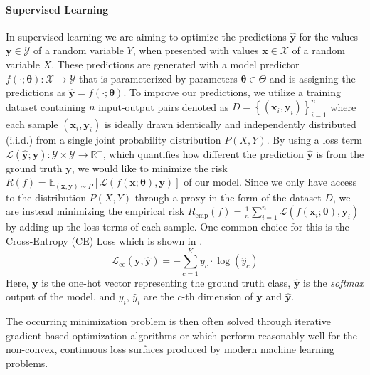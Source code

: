 \paragraph{Supervised Learning}
In supervised learning we are aiming to optimize the predictions $\mathbf{\hat{y}}$ for the values $\mathbf{y} \in \mathcal{Y}$ of a random variable $Y$, when presented with values $\mathbf{x} \in \mathcal{X}$ of a random variable $X$. These predictions are generated with a model predictor $f(\cdot;\boldsymbol{\theta}): \mathcal{X} \rightarrow \mathcal{Y}$ that is parameterized by parameters $\boldsymbol{\theta} \in \Theta$  and is assigning the predictions as $\mathbf{\hat{y}}=f(\cdot;\boldsymbol{\theta})$. To improve our predictions, we utilize a training dataset containing $n$ input-output pairs denoted as $D=\left\{\left(\mathbf{x}_{i}, \mathbf{y}_{i}\right)\right\}_{i=1}^{n}$ where each sample $(\mathbf{x}_i,\mathbf{y}_i)$ is ideally drawn identically and independently distributed (i.i.d.) from a single joint probability distribution $P(X,Y)$. By using a loss term $\mathcal{L} (\mathbf{\hat{y}};\mathbf{y}): \mathcal{Y} \times \mathcal{Y} \rightarrow \mathbb{R}^{+}$, which quantifies how different the prediction $\mathbf{\hat{y}}$ is from the ground truth $\mathbf{y}$, we would like to minimize the risk $R(f) = \mathbb{E}_{(\mathbf{x}, \mathbf{y}) \sim P}[\mathcal{L}(f(\mathbf{x}; \boldsymbol{\theta}), \mathbf{y})]$ of our model. Since we only have access to the distribution $P(X,Y)$ through a proxy in the form of the dataset $D$, we are instead minimizing the empirical risk $R_{\mathrm{emp}}(f)=\frac{1}{n} \sum_{i=1}^n \mathcal{L}\left(f\left(\mathbf{x}_{i};\boldsymbol{\theta}\right), \mathbf{y}_{i}\right)$ by adding up the loss terms of each sample. One common choice for this is the Cross-Entropy (CE) Loss which is shown in .
\begin{equation}
\label{eq:cross_entropy}
    \mathcal{L}_\mathrm{ce}(\mathbf{y}, \mathbf{\hat{y}})=-\sum_{c=1}^{K} y_c \cdot \log \left(\hat{y}_c\right)
\end{equation}
Here, $\mathbf{y}$ is the one-hot vector representing the ground truth class, $\mathbf{\hat{y}}$ is the \emph{softmax} output of the model, and $y_i$, $\hat{y}_i$ are the $c$-th dimension of $\mathbf{y}$ and $\mathbf{\hat{y}}$.

The occurring minimization problem is then often solved through iterative gradient based optimization algorithms \eg \sgd{} \citep{Robbins1951} or \adam \citep{Kingma2015} which perform reasonably well for the non-convex, continuous loss surfaces produced by modern machine learning problems.

